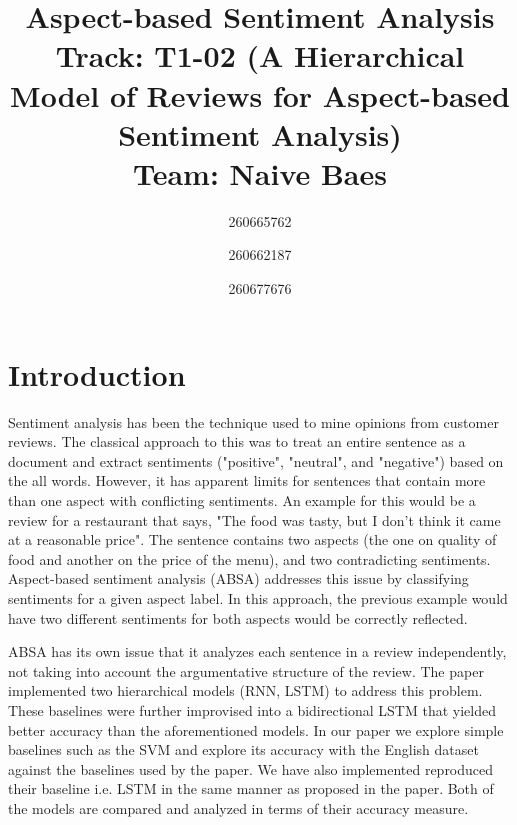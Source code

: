 \documentclass[comsoc,conference]{IEEEtran}
\begin{document}
\title{Aspect-based Sentiment Analysis
	\\ \large{Track: T1-02 (A Hierarchical Model of Reviews for Aspect-based Sentiment Analysis)
	\\ Team: Naive Baes}
}

\author{
	260665762 \\
	\and
	260662187 \\
	\and
	260677676 \\
}

\maketitle

\section{Introduction}

Sentiment analysis has been the technique used to mine opinions from customer reviews. The classical approach to this was to treat an entire sentence as a document and extract sentiments ("positive", "neutral", and "negative") based on the all words. However, it has apparent limits for sentences that contain more than one aspect with conflicting sentiments. An example for this would be a review for a restaurant that says, "The food was tasty, but I don't think it came at a reasonable price". The sentence contains two aspects (the one on quality of food and another on the price of the menu), and two contradicting sentiments. Aspect-based sentiment analysis (ABSA) addresses this issue by classifying sentiments for a given aspect label. In this approach, the previous example would have two different sentiments for both aspects would be correctly reflected.

ABSA has its own issue that it analyzes each sentence in a review independently, not taking into account the argumentative structure of the review. The paper implemented two hierarchical models (RNN, LSTM) to address this problem. These baselines were further improvised into a bidirectional LSTM that yielded better accuracy than the aforementioned models. In our paper we explore simple baselines such as the SVM and explore its accuracy with the English dataset against the baselines used by the paper. We have also implemented reproduced their baseline i.e. LSTM in the same manner as proposed in the paper. Both of the models are compared and analyzed in terms of their accuracy measure.
\end{document}

